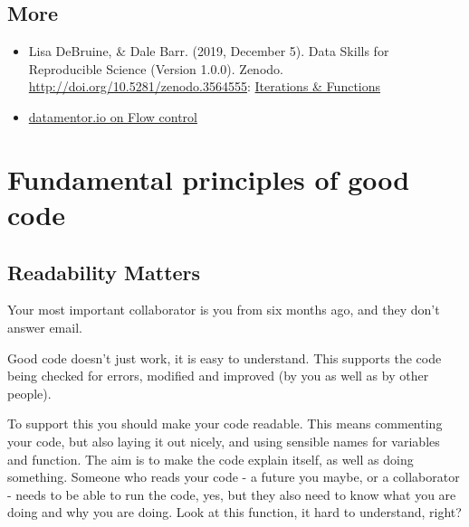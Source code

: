 \documentclass[
]{book}
\providecommand{\tightlist}{%
  \setlength{\itemsep}{0pt}\setlength{\parskip}{0pt}}
\begin{document}
\hypertarget{more}{%
\subsection{More}\label{more}}

\begin{itemize}
\tightlist
\item
  Lisa DeBruine, \& Dale Barr. (2019, December 5). Data Skills for Reproducible Science (Version 1.0.0). Zenodo. \url{http://doi.org/10.5281/zenodo.3564555}: \href{https://psyteachr.github.io/msc-data-skills/func.html}{Iterations \& Functions}
\item
  \href{https://www.datamentor.io/r-programming/if-else-statement/}{datamentor.io on Flow control}
\end{itemize}

\hypertarget{fundamental-principles-of-good-code}{%
\section{Fundamental principles of good code}\label{fundamental-principles-of-good-code}}

\hypertarget{readability-matters}{%
\subsection{Readability Matters}\label{readability-matters}}

Your most important collaborator is you from six months ago, and they don't answer email.

Good code doesn't just work, it is easy to understand. This supports the code being checked for errors, modified and improved (by you as well as by other people).

To support this you should make your code readable. This means commenting your code, but also laying it out nicely, and using sensible names for variables and function. The aim is to make the code explain itself, as well as doing something. Someone who reads your code - a future you maybe, or a collaborator - needs to be able to run the code, yes, but they also need to know what you are doing and why you are doing.
Look at this function, it hard to understand, right?
\end{document}
